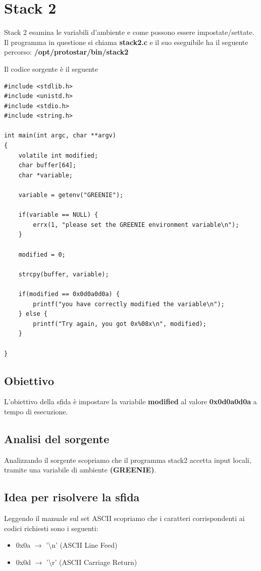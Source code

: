 \section{Stack 2}
Stack 2 esamina le variabili d'ambiente e come possono essere impostate/settate.
Il programma in questione si chiama \textbf{stack2.c} e il suo eseguibile ha il seguente percorso: \textbf{/opt/protostar/bin/stack2}

Il codice sorgente è il seguente
\begin{lstlisting}[style=cstyle]
#include <stdlib.h>
#include <unistd.h>
#include <stdio.h>
#include <string.h>

int main(int argc, char **argv)
{
    volatile int modified;
    char buffer[64];
    char *variable;

    variable = getenv("GREENIE");

    if(variable == NULL) {
        errx(1, "please set the GREENIE environment variable\n");
    }

    modified = 0;

    strcpy(buffer, variable);

    if(modified == 0x0d0a0d0a) {
        printf("you have correctly modified the variable\n");
    } else {
        printf("Try again, you got 0x%08x\n", modified);
    }

}
\end{lstlisting}

\subsection{Obiettivo}
L’obiettivo della sfida è impostare la variabile \textbf{modified} al valore \textbf{0x0d0a0d0a} a tempo di esecuzione.

\subsection{Analisi del sorgente}
Analizzando il sorgente scopriamo che il programma stack2 accetta input locali, tramite una variabile di ambiente \textbf{(GREENIE)}.

\subsection{Idea per risolvere la sfida}
Leggendo il manuale sul set ASCII scopriamo che i caratteri corrispondenti ai codici richiesti sono i seguenti:
\begin{itemize}
    \item 0x0a $\rightarrow$ '\textbackslash n' (ASCII Line Feed)
    \item 0x0d $\rightarrow$ '\textbackslash r' (ASCII Carriage Return)
\end{itemize}

